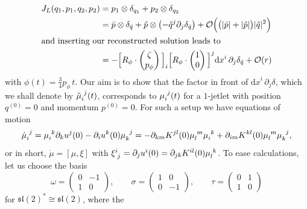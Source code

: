 \documentclass[12pt]{amsart}
\newcommand{\dx}{\ensuremath{\textrm{d}x}}
\begin{document}
\begin{align}
  J_L(q_1,p_1,q_2,p_2)
  &= p_1 \otimes \delta_{q_1} + p_2 \otimes \delta_{q_2} \notag\\
  &= \bar{p} \otimes \delta_{\bar{q}} +\tilde{p} \otimes
     \big({-\tilde{q}^j} \partial_j\delta_{\bar{q}}\big)
    +\mathcal{O}\Big(\big(|\bar{p}|+|\tilde{p}|\big)|\tilde{q}|^2\Big) \notag\\
\intertext{and inserting our reconstructed solution leads to}
  &= -\Big[R_\phi \cdot \begin{pmatrix} \zeta \\ p_\phi \end{pmatrix}\Big]_i
      \Big[R_\phi \cdot \begin{pmatrix} 1   \\ 0         \end{pmatrix}\Big]^j \dx^i\,\partial_j
      \delta_{\bar{q}} +\mathcal{O}(r) \label{eq:asymptotic-dynamics}
\end{align}
with $\phi(t) = \frac{3}{4} p_\phi\,t$. Our aim is to show that
the factor in front of $\dx^i\,\partial_j \delta$, which we shall denote
by $\tilde{\mu}\indices{_i^j}(t)$, corresponds to
$\mu\indices{_i^j}(t)$ for a $1$-jetlet with position $q^{(0)} = 0$
and momentum $p^{(0)} = 0$. For such a setup we have equations of
motion
\begin{equation*}
  \dot{\mu}\indices{_i^j}
  = \mu\indices{_i^k} \partial_k u^j(0) - \partial_i u^k(0) \mu\indices{_k^j}
  = -\partial_{km} K^{jl}(0) \mu\indices{_l^m} \mu\indices{_i^k}
    +\partial_{im} K^{kl}(0) \mu\indices{_l^m} \mu\indices{_k^j},
\end{equation*}
or in short, $\dot{\mu} = [\mu,\xi]$ with $\xi\indices{^i_j} = \partial_j u^i(0) = \partial_{jk} K^{i l}(0) \mu\indices{_l^k}$. To
ease calculations, let us choose the basis
\begin{equation}\label{eq:basis-sl2}
  \omega = \begin{pmatrix}
    0 & -1 \\
    1 & 0
  \end{pmatrix},\qquad
  \sigma = \begin{pmatrix}
    1 & 0 \\
    0 & -1
  \end{pmatrix},\qquad
  \tau = \begin{pmatrix}
    0 & 1 \\
    1 & 0
  \end{pmatrix}
\end{equation}
for $\mathfrak{sl}(2)^* \cong \mathfrak{sl}(2)$, where the
\end{document}
